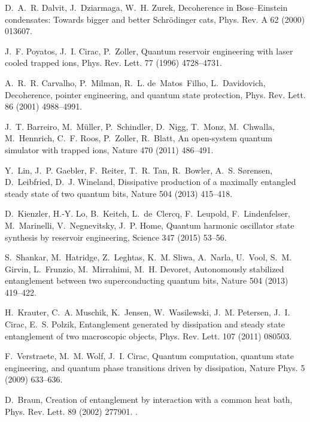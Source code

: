 \documentclass[3p,sort&compress]{elsarticle}
\begin{document}
\begin{thebibliography}{100}
D.~A.~R. Dalvit, J.~Dziarmaga, W.~H. Zurek, Decoherence in {B}ose--{E}instein
  condensates: Towards bigger and better {S}chr{\"o}dinger cats, Phys. Rev. A
  62 (2000) 013607.

J.~F. Poyatos, J.~I. Cirac, P.~Zoller, Quantum reservoir engineering with laser
  cooled trapped ions, Phys. Rev. Lett. 77 (1996) 4728--4731.

A.~R.~R. Carvalho, P.~Milman, R.~L. de~Matos~Filho, L.~Davidovich, Decoherence,
  pointer engineering, and quantum state protection, Phys. Rev. Lett. 86 (2001)
  4988--4991.

J.~T. Barreiro, M.~M{\"u}ller, P.~Schindler, D.~Nigg, T.~Monz, M.~Chwalla,
  M.~Hennrich, C.~F. Roos, P.~Zoller, R.~Blatt, An open-system quantum
  simulator with trapped ions, Nature 470 (2011) 486--491.

Y.~Lin, J.~P. Gaebler, F.~Reiter, T.~R. Tan, R.~Bowler, A.~S. S{\o}rensen,
  D.~Leibfried, D.~J. Wineland, Dissipative production of a maximally entangled
  steady state of two quantum bits, Nature 504 (2013) 415--418.

D.~Kienzler, H.-Y. Lo, B.~Keitch, L.~de~Clercq, F.~Leupold, F.~Lindenfelser,
  M.~Marinelli, V.~Negnevitsky, J.~P. Home, Quantum harmonic oscillator state
  synthesis by reservoir engineering, Science 347 (2015) 53--56.

S.~Shankar, M.~Hatridge, Z.~Leghtas, K.~M. Sliwa, A.~Narla, U.~Vool, S.~M.
  Girvin, L.~Frunzio, M.~Mirrahimi, M.~H. Devoret, Autonomously stabilized
  entanglement between two superconducting quantum bits, Nature 504 (2013)
  419--422.

H.~Krauter, C.~A. Muschik, K.~Jensen, W.~Wasilewski, J.~M. Petersen, J.~I.
  Cirac, E.~S. Polzik, Entanglement generated by dissipation and steady state
  entanglement of two macroscopic objects, Phys. Rev. Lett. 107 (2011) 080503.

F.~Verstraete, M.~M. Wolf, J.~I. Cirac, Quantum computation, quantum state
  engineering, and quantum phase transitions driven by dissipation, Nature
  Phys. 5 (2009) 633--636.

D.~Braun, Creation of entanglement by interaction with a common heat bath,
  Phys. Rev. Lett. 89 (2002) 277901.
\newblock \href {http://dx.doi.org/10.1103/PhysRevLett.89.277901}
  {}.


\end{thebibliography}
\end{document}
